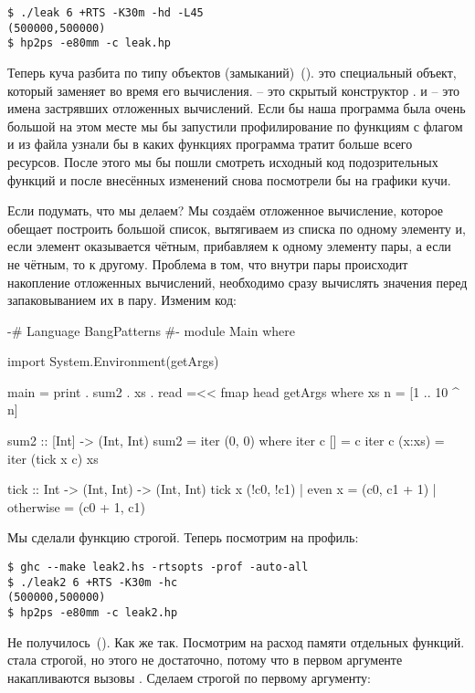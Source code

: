 \begin{verbatim}
$ ./leak 6 +RTS -K30m -hd -L45
(500000,500000)
$ hp2ps -e80mm -c leak.hp
\end{verbatim}

Теперь куча разбита по типу объектов (замыканий)~().
 это специальный объект, который заменяет  во
время его вычисления.  -- это скрытый конструктор .
 и  -- это имена застрявших отложенных
вычислений. Если бы наша программа была очень большой на этом месте мы
бы запустили профилирование по функциям с флагом  и из файла
 узнали бы в каких функциях программа тратит больше всего
ресурсов. После этого мы бы пошли смотреть исходный код подозрительных
функций и после внесённых изменений снова посмотрели бы на графики кучи.


Если подумать, что мы делаем? Мы создаём отложенное вычисление, которое
обещает построить большой список, вытягиваем из списка по одному
элементу и, если элемент оказывается чётным, прибавляем к одному
элементу пары, а если не чётным, то к другому. Проблема в том, что
внутри пары происходит накопление отложенных вычислений, необходимо
сразу вычислять значения перед запаковыванием их в пару. Изменим код:


\begin{code}
{-# Language BangPatterns #-}
module Main where

import System.Environment(getArgs)

main = print . sum2 . xs . read =<< fmap head getArgs  
    where xs n = [1 .. 10 ^ n]

sum2 :: [Int] -> (Int, Int)
sum2 = iter (0, 0)
    where iter c  []     = c
          iter c  (x:xs) = iter (tick x c) xs

tick :: Int -> (Int, Int) -> (Int, Int)
tick x (!c0, !c1) | even x    = (c0, c1 + 1)
                  | otherwise = (c0 + 1, c1)
\end{code}

Мы сделали функцию  строгой. Теперь посмотрим на профиль:


\begin{verbatim}
$ ghc --make leak2.hs -rtsopts -prof -auto-all
$ ./leak2 6 +RTS -K30m -hc
(500000,500000)
$ hp2ps -e80mm -c leak2.hp
\end{verbatim}

Не получилось~(). Как же так. Посмотрим на расход памяти
отдельных функций.  стала строгой, но этого не достаточно,
потому что в первом аргументе  накапливаются вызовы .
Сделаем  строгой по первому аргументу:

